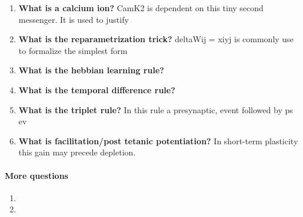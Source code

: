 \documentclass[main]{subfiles}
\begin{document}
\begin{enumerate}
    \item \textbf{What is a calcium ion?}
    CamK2 is dependent on this tiny second messenger.
    It is used to justify
    \item \textbf{What is the reparametrization trick?}
    deltaWij = xiyj is commonly use to formalize the simplest form
    \item \textbf{What is the hebbian learning rule?}
    \item \textbf{What is the temporal difference rule?}
    \item \textbf{What is the triplet rule?}
    In this rule a presynaptic, event followed by ps ev
    \item \textbf{What is facilitation/post tetanic potentiation?}
    In short-term plasticity this gain may precede depletion.
\end{enumerate}

\paragraph{More questions}
\begin{enumerate}
    \item 
    \item 
\end{enumerate}
\end{document}
